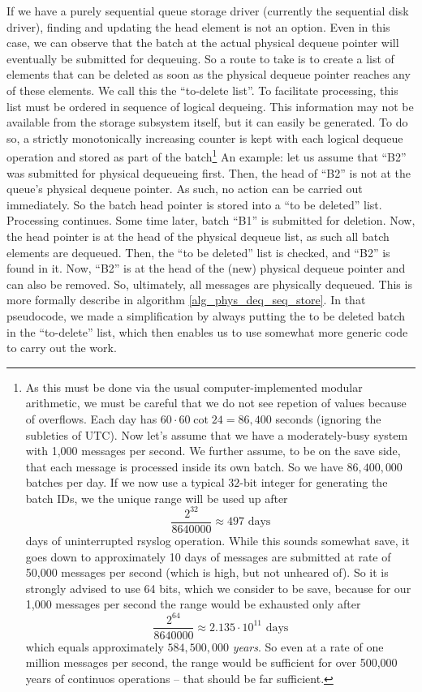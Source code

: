 \documentclass[a4paper,10pt]{article}
\begin{document}
If we have a purely sequential queue storage driver (currently the sequential disk driver), finding and updating the head element is not an option. Even in this case, we can observe that the batch at the actual physical dequeue pointer will eventually be submitted for dequeuing. So a route to take is to create a list of elements that can be deleted as soon as the physical dequeue pointer reaches any of these elements. We call this the ``to-delete list''. To facilitate processing, this list must be ordered in sequence of logical dequeing. This information may not be available from the storage subsystem itself, but it can easily be generated. To do so, a strictly monotonically increasing counter is kept with each logical dequeue operation and stored as part of the batch\footnote{As this must be done via the usual computer-implemented modular arithmetic, we must be careful that we do not see repetion of values because of overflows. Each day has $60 \cdot 60 \cot 24 = 86,400$ seconds (ignoring the subleties of UTC). Now let's assume that we have a moderately-busy system with 1,000 messages per second. We further assume, to be on the save side, that each message is processed inside its own batch. So we have $86,400,000$ batches per day. If we now use a typical $32$-bit integer for generating the batch IDs, we the unique range will be used up after
$$\frac{2^{32}}{8640000} \approx 497 \text{ days}$$
days of uninterrupted rsyslog operation. While this sounds somewhat save, it goes down to approximately 10 days of messages are submitted at rate of 50,000 messages per second (which is high, but not unheared of). So it is strongly advised to use 64 bits, which we consider to be save, because for our 1,000 messages per second the range would be exhausted only after
$$\frac{2^{64}}{8640000} \approx 2.135 \cdot 10^{11} \text{ days}$$
which equals approximately $584,500,000$ \emph{years}. So even at a rate of one million messages per second, the range would be sufficient for over 500,000 years of continuos operations -- that should be far sufficient.}
An example: let us assume that ``B2'' was submitted for physical dequeueing first. Then, the head of ``B2'' is not at the queue's physical dequeue pointer. As such, no action can be carried out immediately. So the batch head pointer is stored into a ``to be deleted'' list. Processing continues. Some time later, batch ``B1'' is submitted for deletion. Now, the head pointer is at the head of the physical dequeue list, as such all batch elements are dequeued. Then, the ``to be deleted'' list is checked, and ``B2'' is found in it. Now, ``B2'' is at the head of the (new) physical dequeue pointer and can also be removed. So, ultimately, all messages are physically dequeued. This is more formally describe in algorithm \ref{alg_phys_deq_seq_store}. In that pseudocode, we made a simplification by always putting the to be deleted batch in the ``to-delete'' list, which then enables us to use somewhat more generic code to carry out the work.
\end{document}
